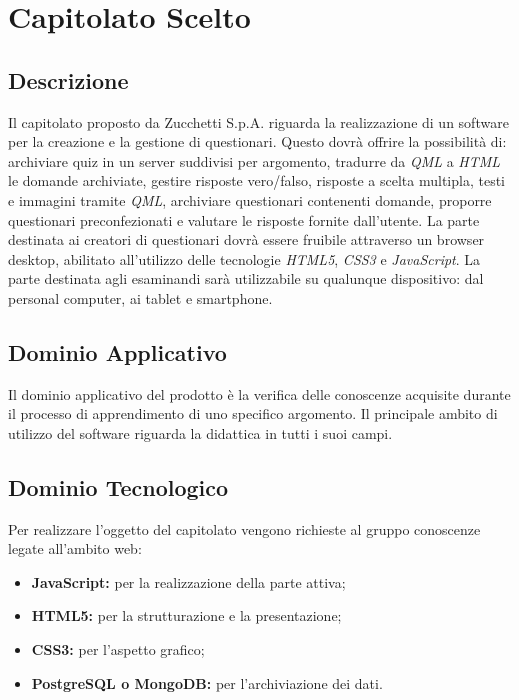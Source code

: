 \newpage
\section{Capitolato Scelto}
\subsection{Descrizione}
Il capitolato proposto da Zucchetti S.p.A. riguarda la realizzazione di un software per la creazione e la gestione di questionari. 
Questo dovrà offrire la possibilità di: archiviare quiz in un server suddivisi per argomento, tradurre da \textit{QML} a \textit{HTML} le domande archiviate, gestire risposte vero/falso, risposte a scelta multipla, testi e immagini tramite \textit{QML}, archiviare questionari contenenti domande, proporre questionari preconfezionati e valutare le risposte fornite dall’utente.
La parte destinata ai creatori di questionari dovrà essere fruibile attraverso un browser desktop, abilitato all’utilizzo delle tecnologie \textit{HTML5}, \textit{CSS3} e \textit{JavaScript}.
La parte destinata agli esaminandi sarà utilizzabile su qualunque dispositivo: dal personal computer, ai tablet e smartphone.

\subsection{Dominio Applicativo}
Il dominio applicativo del prodotto è la verifica delle conoscenze acquisite durante il processo di apprendimento di uno specifico argomento.
Il principale ambito di utilizzo del software riguarda la didattica in tutti i suoi campi.

\subsection{Dominio Tecnologico}
Per realizzare l’oggetto del capitolato vengono richieste al gruppo conoscenze legate all’ambito web:
\begin{itemize}
\item \textbf{JavaScript:} per la realizzazione della parte attiva;
\item \textbf{HTML5:} per la strutturazione e la presentazione; 
\item \textbf{CSS3:} per l’aspetto grafico;
\item \textbf{PostgreSQL o MongoDB:} per l'archiviazione dei dati.
\end{itemize}

